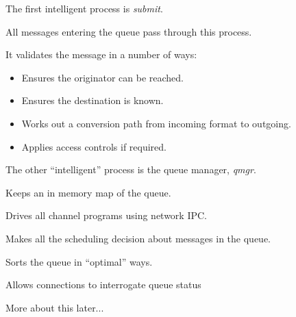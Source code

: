 \begin{bwslide}
\begin{nrtc}
\item	The first intelligent process is {\em submit}.

\item	All messages entering the queue pass through this process.

\item	It validates the message in a number of ways:
	\begin{itemize}
	\item	Ensures the originator can be reached.
	\item	Ensures the destination is known.
	\item	Works out a conversion path from incoming format to outgoing.
	\item	Applies access controls if required.
	\end{itemize}
\end{nrtc}
\end{bwslide}

\begin{bwslide}
\begin{nrtc}
\item	The other ``intelligent'' process is the queue manager, {\em qmgr}.

\item	Keeps an in memory map of the queue.

\item	Drives all channel programs using network IPC.

\item	Makes all the scheduling decision about messages in the queue.

\item	Sorts the queue  in ``optimal'' ways.

\item	Allows connections to interrogate queue status

\item	More about this later...
\end{nrtc}
\end{bwslide}

